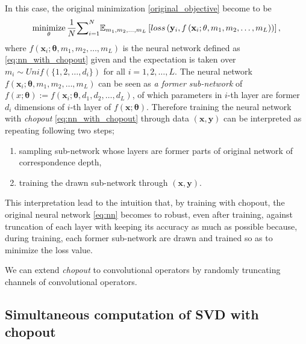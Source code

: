 \documentclass{article}
\newcommand{\minimize}{\mathop{\rm minimize}\limits}
\begin{document}
    In this case, the original minimization \ref{original_objective} become to be
    \begin{equation}
      \minimize_{\mathbf{\theta}} \frac{1}{N} 
      \mathbb{\sum}_{i=1}^N
       \mathbb{E}_{m_1, m_2, \dots, m_L}       
       \left[
       loss \left(\mathbf{y}_i, f\left(\mathbf{x}_i; \mathbf{\theta}, m_1, m_2, \dots, m_L\right)\right) 
       \right], 
       \label{objective_with_chopout}
    \end{equation}
    where $f(\mathbf{x}_i; \mathbf{\theta}, m_1, m_2, \dots, m_L)$ is the neural network defined as \ref{eq:nn_with_chopout} given and the expectation is taken over $m_i \sim Unif(\{1, 2, \dots, d_i\})$ for all $i=1,2,\dots,L$. The neural network $f\left(\mathbf{x}_i; \mathbf{\theta}, m_1, m_2, \dots, m_L\right)$ can be seen as \textit{a former sub-network} of $f(x;
    \mathbf{\theta}) := f(\mathbf{x}_i; \mathbf{\theta}, d_1, d_2, \dots, d_L)$, of which parameters in $i$-th layer are former $d_i$ dimensions of $i$-th layer of $f(\mathbf{x};\mathbf{\theta})$. Therefore training the neural network with \textit{chopout} \ref{eq:nn_with_chopout} through data $(\mathbf{x}, \mathbf{y})$ can be interpreted as repeating following two steps;
    \begin{enumerate}
      \item sampling sub-network whose layers are former parts of original network of correspondence depth,
      \item training the drawn sub-network through $(\mathbf{x}, \mathbf{y})$.
    \end{enumerate}

    This interpretation lead to the intuition that, by training with chopout, the original neural network \ref{eq:nn} becomes to robust, even after training, against truncation of each layer with keeping its accuracy as much as possible because, during training, each former sub-network are drawn and trained so as to minimize the loss value.

    We can extend \textit{chopout} to convolutional operators by randomly truncating channels of convolutional operators. 
    
    \subsection{Simultaneous computation of SVD with chopout}
    
\end{document}
